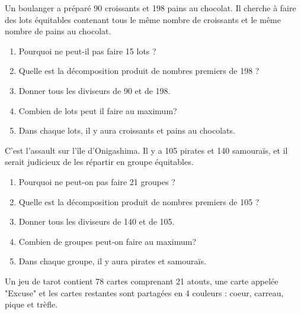 
Un boulanger a préparé 90 croissants et 198 pains au chocolat. Il cherche à faire des lots équitables contenant tous le même nombre de croissants et le même nombre de pains au chocolat.

\begin{enumerate}
	\item Pourquoi ne peut-il pas faire 15 lots ? \dotfill
	\item Quelle est la décomposition produit de nombres premiers de 198 ?
	\item Donner tous les diviseurs de 90 et de 198.
	\item Combien de lots peut il faire au maximum? \dotfill
	\item Dans chaque lots, il y aura \fillin croissants et \fillin pains au chocolats.
\end{enumerate}


C'est l'assault sur l'île d'Onigashima. Il y a 105 pirates et 140 samouraïs, et il serait judicieux de les répartir en groupe équitables.

\begin{enumerate}
	\item Pourquoi ne peut-on pas faire 21 groupes ? \dotfill
	\item Quelle est la décomposition produit de nombres premiers de 105 ?
	\item Donner tous les diviseurs de 140 et de 105.
	\item Combien de groupes peut-on faire au maximum? \dotfill
	\item Dans chaque groupe, il y aura \fillin pirates et \fillin samouraïs.
\end{enumerate}


Un jeu de tarot contient 78 cartes comprenant 21 atouts, une carte appelée "Excuse" et les cartes restantes sont partagées en 4 couleurs : coeur, carreau, pique et trèfle.

